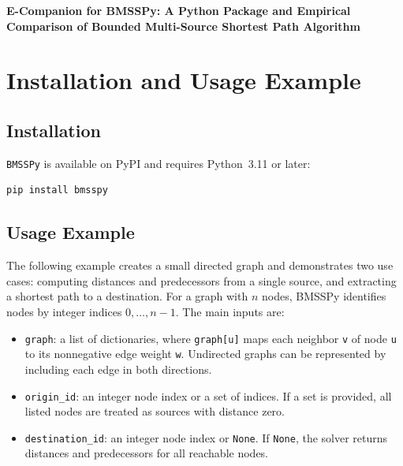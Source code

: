 \documentclass[ijoc,blindrev]{informs3} %
\begin{document}
\clearpage %
\begin{APPENDICES}
\OneAndAHalfSpacedXI
\textbf{E-Companion for BMSSPy: A Python Package and Empirical Comparison
of Bounded Multi-Source Shortest Path Algorithm}


\section{Installation and Usage Example}\label{app:install_example}

\subsection{Installation}\label{subsec:install}

\texttt{BMSSPy} is available on PyPI and requires Python~3.11 or later:
\begin{lstlisting}[language=bash]
pip install bmsspy
\end{lstlisting}

\subsection{Usage Example}\label{subsec:use}

The following example creates a small directed graph and demonstrates two use cases: computing distances and predecessors from a single source, and extracting a shortest path to a destination. {\color{blue}For a graph with \(n\) nodes, BMSSPy identifies nodes by integer indices \(0,\ldots,n-1\).} The main inputs are:
\begin{itemize}
  \item \texttt{graph}: a list of dictionaries, where \texttt{graph[u]} maps each neighbor \texttt{v} of node \texttt{u} to its nonnegative edge weight \texttt{w}. Undirected graphs can be represented by including each edge in both directions.
  \item \texttt{origin\_id}: an integer node index or a set of indices. If a set is provided, all listed nodes are treated as sources with distance zero.
  \item \texttt{destination\_id}: an integer node index or \texttt{None}. If \texttt{None}, the solver returns distances and predecessors for all reachable nodes.
\end{itemize}


\end{APPENDICES}
\end{document}
